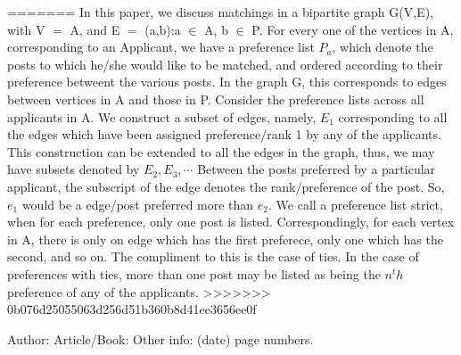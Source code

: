 \documentclass{llncs}
\begin{document}
=======
In this paper, we discuss  matchings in a bipartite graph G(V,E), with V $=$ A\cupP, and E $=$ (a,b):\lbrace a $\in$ A, b $\in$ P\rbrace. 
For every one of the vertices in A, corresponding to an Applicant, we have a preference list $P_a$,
which denote the posts to which he/she would like to be matched, and ordered according to their preference betweent the various posts. In the graph G, this corresponds to edges between vertices in A and those in P. 
Consider the preference lists across all applicants in A. 
We construct a subset of edges, namely, $E_1$ corresponding to all the edges which have been assigned preference/rank 1 by any of the applicants. 
This construction can be extended to all the edges in the graph, thus, we may have subsets denoted by $E_2, E_3, \cdots$ 
Between the posts preferred by a particular applicant, the subscript of the edge denotes the rank/preference of the post. So, $e_1$ would be a edge/post preferred more than $e_2$.
We call a preference list strict, when for each preference, only one post is listed. Correspondingly, for each vertex in A, there is only on edge which has the first preferece, only one which has the second, and so on. The compliment to this is the case of ties. In the case of preferences with ties, more than one post may be listed as being the $n^th$ preference of any of the applicants.
>>>>>>> 0b076d25055063d256d51b360b8d41ee3656ee0f






























%
%

\begin{thebibliography}{1}
Author:
Article/Book:
Other info: (date) page numbers.
\end{thebibliography}
\end{document}
